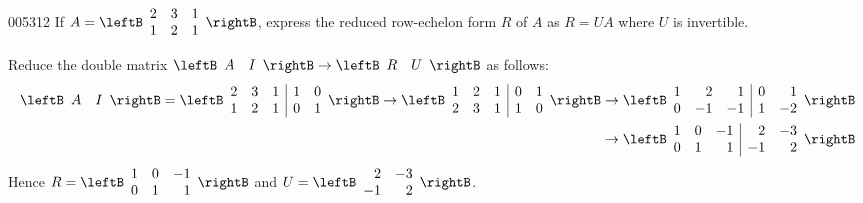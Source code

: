 \begin{example}{}{005312}
If $A = \leftB \begin{array}{rrr}
2 & 3 & 1 \\
1 & 2 & 1
\end{array} \rightB$, express the reduced row-echelon form $R$ of $A$ as $R = UA$ where $U$ is invertible.

\begin{solution}
  Reduce the double matrix $\leftB \begin{array}{cc}
  A & I
  \end{array} \rightB \rightarrow \leftB \begin{array}{cc}
  R & U
  \end{array} \rightB$ as follows:
\begin{align*}
\leftB \begin{array}{cc}
A & I
\end{array} \rightB = \leftB \begin{array}{rrr|rr}
2 & 3 & 1 & 1 & 0 \\
1 & 2 & 1 & 0 & 1
\end{array} \rightB \rightarrow
\leftB \begin{array}{rrr|rr}
1 & 2 & 1 & 0 & 1 \\
2 & 3 & 1 & 1 & 0
\end{array} \rightB &\rightarrow
\leftB \begin{array}{rrr|rr}
1 & 2 & 1 & 0 & 1 \\
0 & -1 & -1 & 1 & -2
\end{array} \rightB \\
&\rightarrow
\leftB \begin{array}{rrr|rr}
1 & 0 & -1 & 2 & -3 \\
0 & 1 & 1 & -1 & 2
\end{array} \rightB
\end{align*}
Hence $R = \leftB \begin{array}{rrr}
1 & 0 & -1 \\
0 & 1 & 1
\end{array} \rightB$
 and $U = \leftB \begin{array}{rr}
 	2 & -3 \\
 	-1 & 2
 \end{array} \rightB$.
\end{solution}
\end{example}

